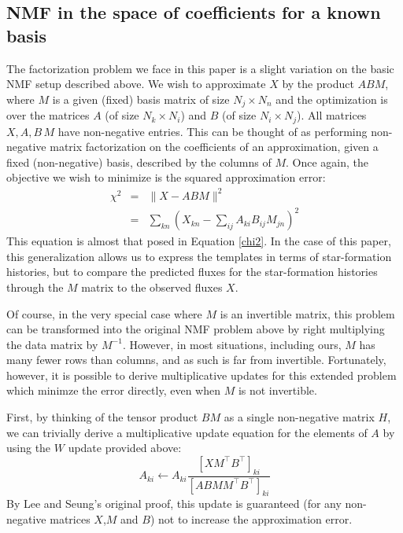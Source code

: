 \documentclass[12pt,preprint]{aastex}
\newcommand{\T}{^{\scriptscriptstyle \top}}
\newcommand{\inv}{^{-1}}
\newcommand{\XX}{X}
\newcommand{\Xkn}{X_{kn}}
\renewcommand{\AA}{A}
\newcommand{\WW}{W}
\newcommand{\HH}{H}
\newcommand{\BB}{B}
\newcommand{\MM}{M}
\newcommand{\Aki}{A_{ki}}
\newcommand{\Bij}{B_{ij}}
\newcommand{\Mjn}{M_{jn}}
\begin{document}
\subsection{NMF in the space of coefficients for a known basis}
The factorization problem we face in this paper is a slight variation on the
basic NMF setup described above. We wish to approximate $\XX$ by the
product $\AA\BB\MM$, 
where $\MM$ is a given (fixed) basis matrix of size $N_j \times N_n$
and the optimization is over the matrices $\AA$ (of size
$N_k\times N_i$) and $\BB$ (of size $N_i\times N_j$). All matrices
$\XX,\AA,\BB\,\MM$ have non-negative entries. This can be thought of
as performing non-negative matrix factorization on the coefficients of
an approximation, given a fixed (non-negative) basis, described by the
columns of $\MM$. Once again, the objective we wish to minimize is the
squared approximation error: 
\begin{eqnarray} 
\chi^2 &=& \|\XX-\AA\BB\MM\|^2\\
&=& \sum_{kn} \left(\Xkn - \sum_{ij} \Aki\Bij\Mjn \right)^2
\end{eqnarray}
This equation is almost that posed in Equation \ref{chi2}.
In the case of this paper, this generalization allows us to express
the templates in terms of star-formation histories, but to compare the
predicted fluxes for the star-formation histories through the $\MM$
matrix to the observed fluxes $\XX$.

Of course, in the very special case where $\MM$ is an invertible
matrix, this problem can be transformed into the original NMF problem above by
right multiplying the data matrix by $\MM\inv$. However, in most
situations, including ours, $\MM$ has many fewer rows than columns, and
as such is far from invertible. Fortunately, however, it is possible
to derive multiplicative updates for this extended problem 
which minimze the error directly, even when $\MM$ is not invertible.

First, by thinking of the tensor product $\BB\MM$ as a single
non-negative matrix $\HH$, we can trivially derive a multiplicative
update equation for the elements of $\AA$ by using the $\WW$ update
provided above: 
\begin{equation}
\Aki \leftarrow \Aki 
\frac{[\XX\MM\T\BB\T]_{ki}}{[\AA\BB\MM\MM\T\BB\T]_{ki}}
\end{equation}
By Lee and Seung's original proof, this update is guaranteed (for any
non-negative matrices $\XX$,$\MM$ and $\BB$) not to increase the
approximation error. 
\end{document}
